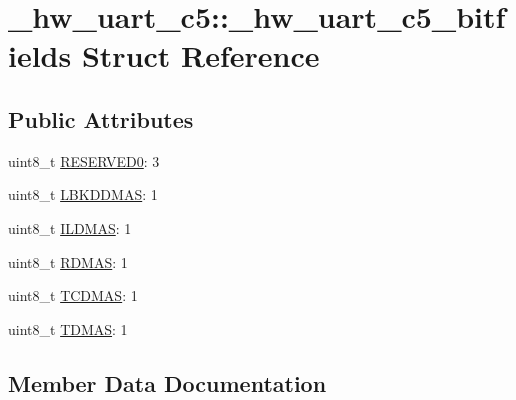 \hypertarget{struct__hw__uart__c5_1_1__hw__uart__c5__bitfields}{}\section{\+\_\+hw\+\_\+uart\+\_\+c5\+:\+:\+\_\+hw\+\_\+uart\+\_\+c5\+\_\+bitfields Struct Reference}
\label{struct__hw__uart__c5_1_1__hw__uart__c5__bitfields}
\subsection*{Public Attributes}
\begin{DoxyCompactItemize}
\item 
uint8\+\_\+t \hyperlink{struct__hw__uart__c5_1_1__hw__uart__c5__bitfields_a85b9765d4d7db449b009843014e91501}{R\+E\+S\+E\+R\+V\+E\+D0}\+: 3
\item 
uint8\+\_\+t \hyperlink{struct__hw__uart__c5_1_1__hw__uart__c5__bitfields_a349db284b333c221da4ccd753feed4dc}{L\+B\+K\+D\+D\+M\+AS}\+: 1
\item 
uint8\+\_\+t \hyperlink{struct__hw__uart__c5_1_1__hw__uart__c5__bitfields_a6fad734729eff587cbb2914598edaf19}{I\+L\+D\+M\+AS}\+: 1
\item 
uint8\+\_\+t \hyperlink{struct__hw__uart__c5_1_1__hw__uart__c5__bitfields_aaed19524d60e393365a431303f8f08d4}{R\+D\+M\+AS}\+: 1
\item 
uint8\+\_\+t \hyperlink{struct__hw__uart__c5_1_1__hw__uart__c5__bitfields_a23d87078cbefc14431c0d0ad90bef352}{T\+C\+D\+M\+AS}\+: 1
\item 
uint8\+\_\+t \hyperlink{struct__hw__uart__c5_1_1__hw__uart__c5__bitfields_aa14cc33be62d1d165eacc013db11e6bf}{T\+D\+M\+AS}\+: 1
\end{DoxyCompactItemize}


\subsection{Member Data Documentation}
